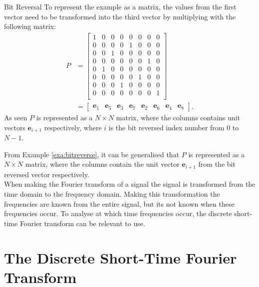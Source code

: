 \begin{example}{Bit Reversal}
    To represent the example as a matrix, the values from the first vector need to be transformed into the third vector by multiplying with the following matrix:
    \begin{align*}
        P&=
        \begin{bmatrix}
            1 & 0 & 0 & 0 & 0 & 0 & 0 & 0\\
            0 & 0 & 0 & 0 & 1 & 0 & 0 & 0\\
            0 & 0 & 1 & 0 & 0 & 0 & 0 & 0\\
            0 & 0 & 0 & 0 & 0 & 0 & 1 & 0\\
            0 & 1 & 0 & 0 & 0 & 0 & 0 & 0\\
            0 & 0 & 0 & 0 & 0 & 1 & 0 & 0\\
            0 & 0 & 0 & 1 & 0 & 0 & 0 & 0\\
            0 & 0 & 0 & 0 & 0 & 0 & 0 & 1\\
        \end{bmatrix}\\
        &=\begin{bmatrix}
        \mathbf{e}_1 & \mathbf{e}_5 & \mathbf{e}_3 & \mathbf{e}_7 & \mathbf{e}_2 & \mathbf{e}_6 & \mathbf{e}_4 & \mathbf{e}_8
        \end{bmatrix}.
 \end{align*}
   As seen $P$ is represented as a $N \times N$ matrix, where the columns contains unit vectors $\mathbf{e}_{i+1}$ respectively, where $i$ is the bit reversed index number from $0$ to $N-1$.
    \label{exa:bitreverse}
\end{example}
From Example \ref{exa:bitreverse}, it can be generalised that $P$ is represented as a $N \times N$ matrix, where the columns contain the unit vector $\mathbf{e}_{i+1}$ from the bit reversed vector respectively. \\

When making the Fourier transform of a signal the signal is transformed from the time domain to the frequency domain. Making this transformation the frequencies are known from the entire signal, but its not known when these frequencies occur. To analyse at which time frequencies occur, the discrete short-time Fourier transform can be relevant to use. 

\section{The Discrete Short-Time Fourier Transform}

